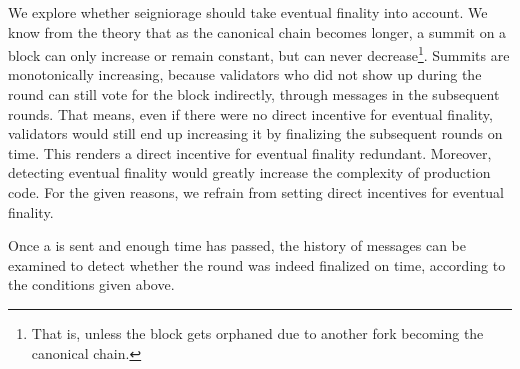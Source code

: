 We explore whether seigniorage should take eventual finality into account. We know from the theory that as the canonical chain becomes longer, a summit on a block can only increase or remain constant, but can never decrease\footnote{That is, unless the block gets orphaned due to another fork becoming the canonical chain.}. Summits are monotonically increasing, because validators who did not show up during the round can still vote for the block indirectly, through messages in the subsequent rounds. That means, even if there were no direct incentive for eventual finality, validators would still end up increasing it by finalizing the subsequent rounds on time. This renders a direct incentive for eventual finality redundant. Moreover, detecting eventual finality would greatly increase the complexity of production code. For the given reasons, we refrain from setting direct incentives for eventual finality.

Once a \PROP is sent and enough time has passed, the history of messages can be examined to detect whether the round was indeed finalized on time, according to the conditions given above.

